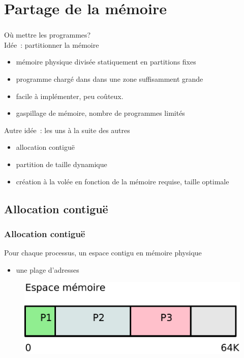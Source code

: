 \section{Partage de la mémoire}
\begin{frame}
\frametitle{\insertsection}
Où mettre les programmes?\\
\vspace{0.5cm}
Idée~: partitionner la mémoire
\begin{itemize}
\item mémoire physique divisée statiquement en partitions fixes
\item programme chargé dans dans une zone suffisamment grande 
\item facile à implémenter, peu coûteux. 
\item gaspillage de mémoire, nombre de programmes limités
\end{itemize}
\vspace{0.5cm}
\pause Autre idée~: les uns à la suite des autres
\begin{itemize}
\item[\ding{212}] allocation contiguë
\item partition de taille dynamique
\item création à la volée en fonction de la mémoire requise, taille optimale
\end{itemize}
\end{frame}

\subsection{Allocation contiguë}
\begin{frame}
  \frametitle{Allocation contiguë}
Pour chaque processus, un espace \alert{contigu} en mémoire physique
\begin{itemize}
\item[\ding{212}] une plage d'adresses
\end{itemize}
\vspace{0.5cm}
\begin{figure}
  \includegraphics[width=0.8\linewidth]{fig2/dia-partage-memoire}
\end{figure}
\end{frame}

